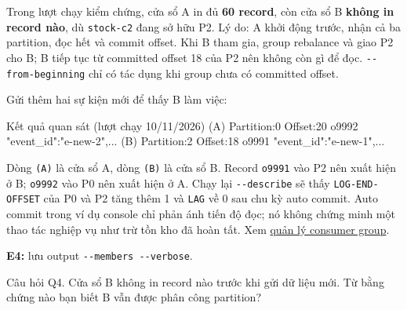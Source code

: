 Trong lượt chạy kiểm chứng, cửa sổ A in đủ \textbf{60 record}, còn cửa sổ B \textbf{không in record nào}, dù \texttt{stock-\allowbreak{}c2} đang sở hữu P2. Lý do: A khởi động trước, nhận cả ba partition, đọc hết và commit offset. Khi B tham gia, group rebalance và giao P2 cho B; B tiếp tục từ committed offset 18 của P2 nên không còn gì để đọc. \texttt{-\allowbreak{}-\allowbreak{}from-\allowbreak{}beginning} chỉ có tác dụng khi group chưa có committed offset.


Gửi thêm hai sự kiện mới để thấy B làm việc:



\begin{aivnCodeOutput}{Kết quả quan sát (lượt chạy 10/11/2026)}
(A) Partition:0  Offset:20  o9992  {"event_id":"e-new-2",...}
(B) Partition:2  Offset:18  o9991  {"event_id":"e-new-1",...}
\end{aivnCodeOutput}

Dòng \texttt{(A)} là cửa sổ A, dòng \texttt{(B)} là cửa sổ B. Record \texttt{o9991} vào P2 nên xuất hiện ở B; \texttt{o9992} vào P0 nên xuất hiện ở A. Chạy lại \texttt{-\allowbreak{}-\allowbreak{}describe} sẽ thấy \texttt{LOG-\allowbreak{}END-\allowbreak{}OFFSET} của P0 và P2 tăng thêm 1 và \texttt{LAG} về 0 sau chu kỳ auto commit. Auto commit trong ví dụ console chỉ phản ánh tiến độ đọc; nó không chứng minh một thao tác nghiệp vụ như trừ tồn kho đã hoàn tất. Xem \href{https://kafka.apache.org/41/operations/basic-kafka-operations/}{quản lý consumer group}.


\begin{evidencebox}
\textbf{E4:} lưu output \texttt{-\allowbreak{}-\allowbreak{}members -\allowbreak{}-\allowbreak{}verbose}.
\end{evidencebox}

\begin{questionbox}{Câu hỏi Q4.}
Cửa sổ B không in record nào trước khi gửi dữ liệu mới. Từ bằng chứng nào bạn biết B vẫn được phân công partition?
\end{questionbox}

